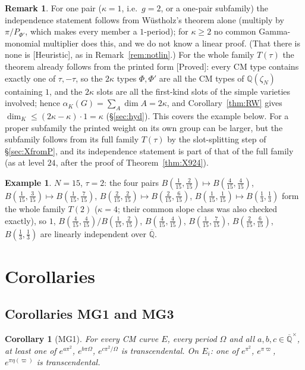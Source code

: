 \documentclass[11pt]{amsart}
\newtheorem{corollary}[theorem]{Corollary}
\theoremstyle{definition}
\newtheorem{remark}[theorem]{Remark}
\newtheorem{example}[theorem]{Example}
\newcommand{\Qb}{\overline{\mathbb{Q}}}
\newcommand{\Q}{\mathbb{Q}}
\newcommand{\vp}{\varpi}
\newcommand{\lab}[1]{\textup{[#1]}}
\begin{document}
\begin{remark}
For one pair ($\kappa=1$, i.e.\ $g=2$, or a one-pair subfamily) the independence statement follows from W\"ustholz's
theorem alone (multiply by $\pi/P_{\Phi'}$, which makes every member a $1$-period); for $\kappa\ge2$ no common
Gamma-monomial multiplier does this, and we do not know a linear proof. (That there is none is \lab{Heuristic}, as in
Remark~\ref{rem:notlin}.) For the whole family $T(\tau)$ the theorem already follows from the printed form \cite[Th\'eor\`eme (iii)]{RW93}
\lab{Proved}: every CM type contains exactly one of $\tau,-\tau$, so the $2\kappa$ types $\Phi,\Phi'$ are all the CM types
of $\Q(\zeta_N)$ containing $1$, and the $2\kappa$ slots are all the first-kind slots of the simple varieties involved;
hence $\alpha_K(G)=\sum_A\dim A=2\kappa$, and Corollary~\ref{thm:RW} gives $\dim_K\le(2\kappa-\kappa)\cdot1=\kappa$
(\S\ref{sec:hyd}). This covers the example below. For a proper subfamily the printed weight on its own group can be
larger, but the subfamily follows from its full family $T(\tau)$ by the slot-splitting step of \S\ref{sec:XfromP}, and its
independence statement is part of that of the full family (as at level $24$, after the proof of
Theorem~\ref{thm:X924}).
\end{remark}

\begin{example}
$N=15$, $\tau=2$: the four pairs $B(\frac1{15},\frac2{15})\mapsto B(\frac4{15},\frac4{15})$,
$B(\frac1{15},\frac3{15})\mapsto B(\frac1{15},\frac7{15})$, $B(\frac2{15},\frac2{15})\mapsto B(\frac2{15},\frac6{15})$,
$B(\frac1{15},\frac1{15})\mapsto B(\frac13,\frac13)$ form the whole family $T(2)$ ($\kappa=4$; their common slope class was also
checked exactly), so $1$, $B(\frac4{15},\frac4{15})/B(\frac1{15},\frac2{15})$, $B(\frac4{15},\frac4{15})$,
$B(\frac1{15},\frac7{15})$, $B(\frac2{15},\frac6{15})$, $B(\frac13,\frac13)$ are linearly independent over $\Qb$.
\end{example}

\section{Corollaries}\label{sec:cor}

\subsection{Corollaries MG1 and MG3}\label{sec:MG13}
\begin{corollary}[MG1]\label{cor:MG1}
For every CM curve $E$, every period $\Omega$ and all $a,b,c\in\Qb^\times$, at least one of
$e^{a\pi^2}$, $e^{b\pi\Omega}$, $e^{c\pi^2/\Omega}$ is transcendental. On $E_i$: one of $e^{\pi^2}$, $e^{\pi\vp}$,
$e^{\pi\eta(\vp)}$ is transcendental.
\end{corollary}
\end{document}
